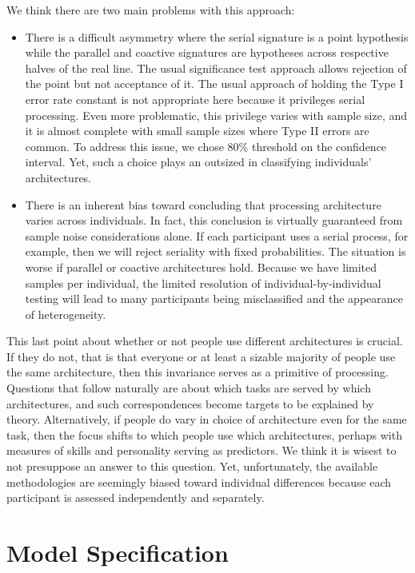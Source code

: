 \documentclass[fignum,nobf,man]{apa}
\begin{document}
We think there are two main problems with this approach:
\begin{itemize}

\item There is a difficult asymmetry where the serial signature is a point hypothesis while the parallel and coactive signatures are hypotheses across respective halves of the real line.  The usual significance test approach allows rejection of the point but not acceptance of it.   The usual approach of holding the Type I error rate constant is not appropriate here because it privileges serial processing.  Even more problematic, this privilege varies with sample size, and it is almost complete with  small sample sizes where Type II errors are common.  To address this issue, we chose 80\% threshold on
the confidence interval.  Yet, such a choice plays an outsized in classifying individuals' architectures.  

\item There is an inherent bias toward concluding that processing architecture varies across individuals.  In fact, this conclusion is virtually guaranteed from sample noise considerations alone.  If each participant uses a serial process, for example, then we will reject seriality with fixed probabilities.  The situation is worse if parallel or coactive architectures hold.  Because we have limited samples per individual, the limited resolution of individual-by-individual testing will  lead to many participants being misclassified and the appearance of heterogeneity. 
\end{itemize}

This last point about whether or not people use different
architectures is crucial.  If they do not, that is that everyone or
at least a sizable majority of people use the same architecture, then
this invariance serves as a primitive of processing.  Questions that
follow naturally are about which tasks are served by which
architectures, and such correspondences become targets to be explained
by theory.  Alternatively, if people do vary in choice of architecture
even for the same task, then the focus shifts to which people use
which architectures, perhaps with measures of skills and personality
serving as predictors.  We think it is wisest to not presuppose an
answer to this question.  Yet, unfortunately, the available
methodologies are seemingly biased toward individual differences
because each participant is assessed independently and separately.


\section{Model Specification}
\end{document}
